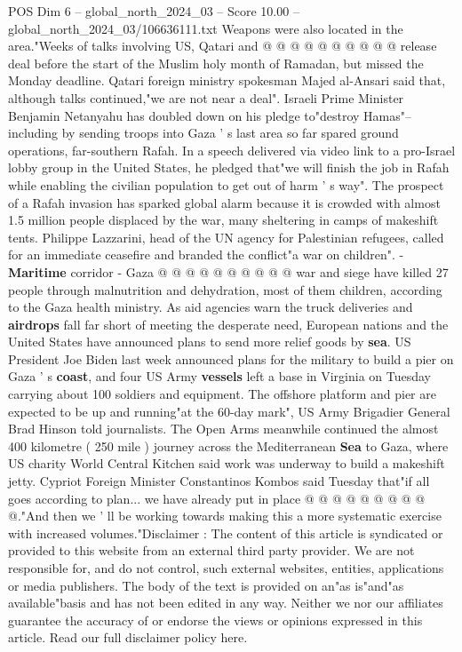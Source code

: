 \begin{textsample}{POS Dim 6 – global\_north\_2024\_03 – Score 10.00 – global\_north\_2024\_03/106636111.txt}
Weapons were also located in the area."Weeks of talks involving US, Qatari and @ @ @ @ @ @ @ @ @ @ release deal before the start of the Muslim holy month of Ramadan, but missed the Monday deadline.
Qatari foreign ministry spokesman Majed al-Ansari said that, although talks continued,"we are not near a deal".
Israeli Prime Minister Benjamin Netanyahu has doubled down on his pledge to"destroy Hamas"-- including by sending troops into Gaza ' s last area so far spared ground operations, far-southern Rafah.
In a speech delivered via video link to a pro-Israel lobby group in the United States, he pledged that"we will finish the job in Rafah while enabling the civilian population to get out of harm ' s way".
The prospect of a Rafah invasion has sparked global alarm because it is crowded with almost 1.5 million people displaced by the war, many sheltering in camps of makeshift tents.
Philippe Lazzarini, head of the UN agency for Palestinian refugees, called for an immediate ceasefire and branded the conflict"a war on children". - \textbf{Maritime} corridor - Gaza @ @ @ @ @ @ @ @ @ @ war and siege have killed 27 people through malnutrition and dehydration, most of them children, according to the Gaza health ministry.
As aid agencies warn the truck deliveries and \textbf{airdrops} fall far short of meeting the desperate need, European nations and the United States have announced plans to send more relief goods by \textbf{sea}.
US President Joe Biden last week announced plans for the military to build a pier on Gaza ' s \textbf{coast}, and four US Army \textbf{vessels} left a base in Virginia on Tuesday carrying about 100 soldiers and equipment.
The offshore platform and pier are expected to be up and running"at the 60-day mark", US Army Brigadier General Brad Hinson told journalists.
The Open Arms meanwhile continued the almost 400 kilometre ( 250 mile ) journey across the Mediterranean \textbf{Sea} to Gaza, where US charity World Central Kitchen said work was underway to build a makeshift jetty.
Cypriot Foreign Minister Constantinos Kombos said Tuesday that"if all goes according to plan... we have already put in place @ @ @ @ @ @ @ @ @ @."And then we ' ll be working towards making this a more systematic exercise with increased volumes."Disclaimer : The content of this article is syndicated or provided to this website from an external third party provider.
We are not responsible for, and do not control, such external websites, entities, applications or media publishers.
The body of the text is provided on an"as is"and"as available"basis and has not been edited in any way.
Neither we nor our affiliates guarantee the accuracy of or endorse the views or opinions expressed in this article.
Read our full disclaimer policy here.

\end{textsample}
